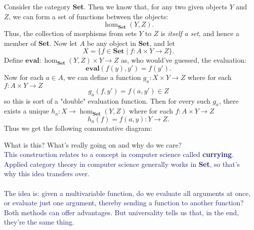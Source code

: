     \begin{example}
        Consider the category \textbf{Set}. Then we know that, for any
        two given objects $Y$ and $Z$, we can form a set of functions 
        between the objects:
        \[
            \hom_{\textbf{Set}}(Y, Z).
        \]
        Thus, the collection of morphisms from sets $Y$ to $Z$ is
        \textit{itself a set}, and hence a member of \textbf{Set}.
        Now let $A$ be any object in $\textbf{Set}$, and let 
        \[
            X = \{f \in \textbf{Set} \mid f: A \times Y \to Z\}.            
        \]
        Define $\textbf{eval}: \hom_{\textbf{Set}}(Y, Z)\times Y \to
        Z$ as, who would've guessed, the evaluation:
        \[
            \textbf{eval}(f(y), y') = f(y').
        \] 
        Now for each $a \in A$, we can define a function $g_a: X
        \times Y \to Z$ where for each $f: A \times Y \to Z$
        \[
            g_a(f, y') = f(a, y') \in Z
        \]
        so this is sort of a "double" evaluation function.
        Then for every such $g_a$, there exists a unique $h_a: X \to
        \hom_{\textbf{Set}}(Y, Z)$ where for each $f: A \times Y \to Z$
        \[ 
            h_a(f) = f(a, y): Y \to Z.
        \] 
        Thus we get the following commutative diagram:
        \begin{center}
            \hspace{1cm}
        \end{center}
        What is this? What's really going on and why do we care?\\
        \textcolor{MidnightBlue}{This construction relates to a concept in
        computer science called
        \textbf{currying}. Applied category theory in computer science
        generally works in \textbf{Set}, so that's why this idea
        transfers over.
        \\
        \\
        The idea is: given a multivariable function, do we evaluate
        all arguments at once, or evaluate just one argument, thereby
        sending a function to another function? Both methods can offer 
        advantages. But universality tells us that, in the end, they're the same thing.}


\end{example}
